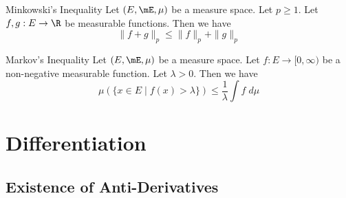 \documentclass[a4paper]{article}
\begin{document}
\begin{prp}{Minkowski's Inequality}{} Let $(E,\mE,\mu)$ be a measure space. Let $p\geq 1$. Let $f,g:E\to\R$ be measurable functions. Then we have $$\|f+g\|_p\leq\|f\|_p+\|g\|_p$$
\end{prp}

\begin{prp}{Markov's Inequality}{} Let $(E,\mE,\mu)$ be a measure space. Let $f:E\to[0,\infty)$ be a non-negative measurable function. Let $\lambda>0$. Then we have $$\mu(\{x\in E\;|\;f(x)>\lambda\})\leq\frac{1}{\lambda}\int f\;d\mu$$
\end{prp}

\pagebreak
\section{Differentiation}
\subsection{Existence of Anti-Derivatives}
\end{document}
